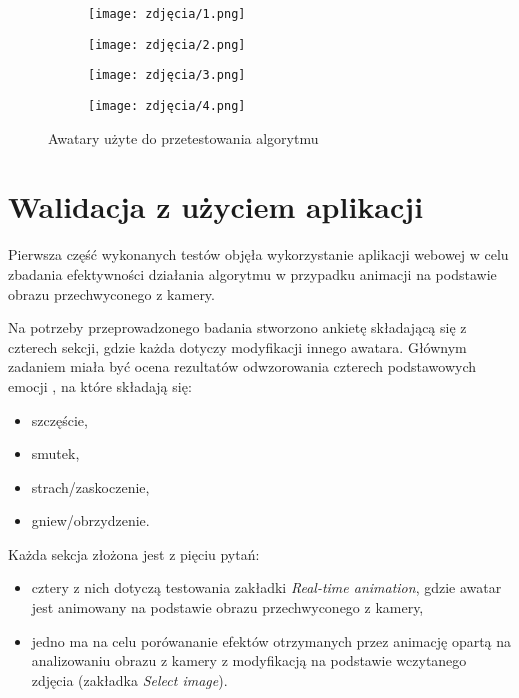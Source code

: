 \begin{figure}[h]
	\centering
	\begin{subfigure}{0.35\textwidth}
		\centering
		\texttt{[image: zdjęcia/1.png]}
		\subcaption{\label{avatar_1}}
	\end{subfigure}
	\begin{subfigure}{0.35\textwidth}
		\centering
		\texttt{[image: zdjęcia/2.png]}
		\subcaption{\label{avatar_2}}
	\end{subfigure}
	\begin{subfigure}{0.35\textwidth}
		\centering
		\texttt{[image: zdjęcia/3.png]}
		\subcaption{\label{avatar_3}}
	\end{subfigure}
	\begin{subfigure}{0.35\textwidth}
		\centering
		\texttt{[image: zdjęcia/4.png]}
		\subcaption{\label{avatar_4}}
	\end{subfigure}
	
	\caption{\label{fig:avatars}Awatary użyte do przetestowania algorytmu}
\end{figure}


\section{Walidacja z użyciem aplikacji}
Pierwsza część wykonanych testów objęła wykorzystanie aplikacji webowej w celu zbadania efektywności działania algorytmu w przypadku animacji na podstawie obrazu przechwyconego z kamery. 

Na potrzeby przeprowadzonego badania stworzono ankietę składającą się z czterech sekcji, gdzie każda dotyczy modyfikacji innego awatara. Głównym zadaniem miała być ocena rezultatów odwzorowania czterech podstawowych emocji \cite{emotions}, na które składają się:

\begin{itemize}
    \item szczęście,
    \item smutek,
    \item strach/zaskoczenie,
    \item gniew/obrzydzenie.
\end{itemize}

Każda sekcja złożona jest z pięciu pytań:
\begin{itemize}
    \item cztery z nich dotyczą testowania zakładki \textit{Real-time animation}, gdzie awatar jest animowany na podstawie obrazu przechwyconego z kamery,
    \item jedno ma na celu porówananie efektów otrzymanych przez animację opartą na analizowaniu obrazu z kamery z modyfikacją na podstawie wczytanego zdjęcia (zakładka \textit{Select image}).
\end{itemize}

